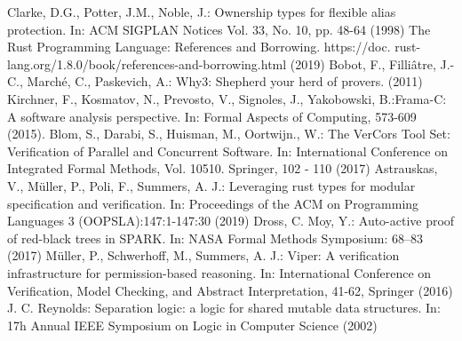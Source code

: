 \documentclass[runningheads]{llncs}
\begin{document}
%
%
%
% 
% 
%
\begin{thebibliography}{8}
Clarke, D.G., Potter, J.M., Noble, J.: Ownership types for flexible alias protection. In: ACM SIGPLAN Notices Vol. 33, No. 10, pp. 48-64 (1998)
  The Rust Programming Language: References and Borrowing. https://doc.
rust-lang.org/1.8.0/book/references-and-borrowing.html (2019)
  Bobot, F., Filli{\^a}tre, J.-C., March{\'e}, C., Paskevich, A.: Why3: Shepherd your herd of provers. (2011)
  Kirchner, F., Kosmatov, N., Prevosto, V., Signoles, J., Yakobowski, B.:Frama-C: A software analysis perspective. In: Formal Aspects of Computing, 573-609 (2015).
Blom, S., Darabi, S., Huisman, M., Oortwijn., W.: The VerCors Tool Set: Verification of Parallel and Concurrent Software. In:  International Conference on Integrated Formal Methods, Vol. 10510. Springer, 102 - 110 (2017)
  Astrauskas, V., M\"uller, P., Poli, F., Summers, A. J.: Leveraging rust types for modular specification and verification.
  In: Proceedings of the ACM on Programming Languages 3 (OOPSLA):147:1-147:30 (2019)
  Dross, C. Moy, Y.: Auto-active proof of red-black trees in SPARK.
  In: NASA Formal Methods Symposium: 68--83 (2017)
Müller, P., Schwerhoff, M., Summers, A. J.: Viper: A verification infrastructure for permission-based reasoning. In: International Conference on Verification, Model Checking, and Abstract Interpretation, 41-62, Springer (2016)
J. C. Reynolds: Separation logic: a logic for shared mutable data structures. In: 17h Annual IEEE
Symposium on Logic in Computer Science (2002)
\end{thebibliography}
\end{document}
